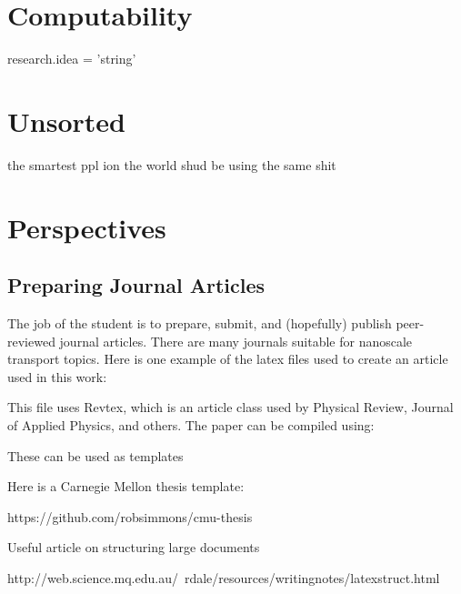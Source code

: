 \section{Computability}

research.idea = 'string'

\section{Unsorted}
 
the smartest ppl ion the world shud be using the same shit

\section{Perspectives}

\subsection{Preparing Journal Articles}

The job of the student is to prepare, submit, and (hopefully) publish 
peer-reviewed journal articles. There are many journals suitable for 
nanoscale transport topics.  Here is one example of the latex files 
used to create an article used in this work:

This file uses Revtex, which is an article class used by Physical Review, 
Journal of Applied Physics, and others. The paper can be compiled using:



These can be used as templates



Here is a Carnegie Mellon thesis template:

https://github.com/robsimmons/cmu-thesis

Useful article on structuring large documents

http://web.science.mq.edu.au/~rdale/resources/writingnotes/latexstruct.html



